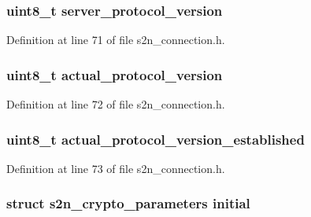\subsubsection[{\texorpdfstring{server\+\_\+protocol\+\_\+version}{server_protocol_version}}]{\setlength{\rightskip}{0pt plus 5cm}uint8\+\_\+t server\+\_\+protocol\+\_\+version}\hypertarget{structs2n__connection_ae48c8e6d0ef10e7b815dd500562a47e7}{}\label{structs2n__connection_ae48c8e6d0ef10e7b815dd500562a47e7}


Definition at line 71 of file s2n\+\_\+connection.\+h.

\subsubsection[{\texorpdfstring{actual\+\_\+protocol\+\_\+version}{actual_protocol_version}}]{\setlength{\rightskip}{0pt plus 5cm}uint8\+\_\+t actual\+\_\+protocol\+\_\+version}\hypertarget{structs2n__connection_af9b47a1de13de52e7beddb948a40fec1}{}\label{structs2n__connection_af9b47a1de13de52e7beddb948a40fec1}


Definition at line 72 of file s2n\+\_\+connection.\+h.

\subsubsection[{\texorpdfstring{actual\+\_\+protocol\+\_\+version\+\_\+established}{actual_protocol_version_established}}]{\setlength{\rightskip}{0pt plus 5cm}uint8\+\_\+t actual\+\_\+protocol\+\_\+version\+\_\+established}\hypertarget{structs2n__connection_ab54a0b4ad8370fee08f0c47917684e65}{}\label{structs2n__connection_ab54a0b4ad8370fee08f0c47917684e65}


Definition at line 73 of file s2n\+\_\+connection.\+h.

\subsubsection[{\texorpdfstring{initial}{initial}}]{\setlength{\rightskip}{0pt plus 5cm}struct {\bf s2n\+\_\+crypto\+\_\+parameters} initial}\hypertarget{structs2n__connection_afd0633da7a12696e4a8fdbf802701a05}{}\label{structs2n__connection_afd0633da7a12696e4a8fdbf802701a05}


